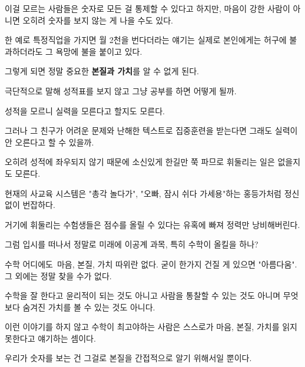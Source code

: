 이걸 모르는 사람들은 숫자로 모든 걸 통제할 수 있다고 하지만, 마음이 강한 사람이 아니면 오히려 숫자를 보지 않는 게 나을 수도 있다.
\vspace{5mm}

한 예로 특정직업을 가지면 월 2천을 번다더라는 얘기는 실제로 본인에게는 허구에 불과하더라도 그 욕망에 불을 붙이고 있다.
\vspace{5mm}

그렇게 되면 정말 중요한 \textbf{본질과 가치}를 알 수 없게 된다.
\vspace{5mm}

극단적으로 말해 성적표를 보지 않고 그냥 공부를 하면 어떻게 될까.
\vspace{5mm}

성적을 모르니 실력을 모른다고 할지도 모른다.
\vspace{5mm}

그러나 그 친구가 어려운 문제와 난해한 텍스트로 집중훈련을 받는다면 그래도 실력이 안 오른다고 할 수 있을까.
\vspace{5mm}

오히려 성적에 좌우되지 않기 때문에 소신있게 한길만 쭉 파므로 휘둘리는 일은 없을지도 모른다.
\vspace{5mm}

현재의 사교육 시스템은 "총각 놀다가", "오빠, 잠시 쉬다 가세용"하는 홍등가처럼 정신없이 번잡하다.
\vspace{5mm}

거기에 휘둘리는 수험생들은 점수를 올릴 수 있다는 유혹에 빠져 정력만 낭비해버린다.
\vspace{5mm}

그럼 입시를 떠나서 정말로 미래에 이공계 과목, 특히 수학이 올킬을 하나?
\vspace{5mm}

수학 어디에도 마음, 본질, 가치 따위란 없다. 굳이 한가지 건질 게 있으면 "아름다움". 그 외에는 정말 찾을 수가 없다.
\vspace{5mm}

수학을 잘 한다고 윤리적이 되는 것도 아니고 사람을 통찰할 수 있는 것도 아니며 무엇보다 숨겨진 가치를 볼 수 있는 것도 아니다.
\vspace{5mm}

이런 이야기를 하지 않고 수학이 최고야하는 사람은 스스로가 마음, 본질, 가치를 읽지 못한다고 얘기하는 셈이다.
\vspace{5mm}

우리가 숫자를 보는 건 그걸로 본질을 간접적으로 알기 위해서일 뿐이다.
\vspace{5mm}







